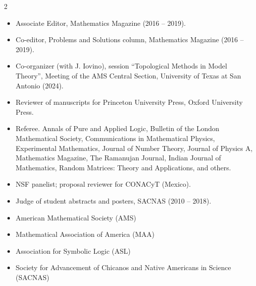 \documentclass[10pt,a4paper,withhyper]{altacv}
\begin{document}
\begin{paracol}{2}
\begin{itemize}
  \item Associate Editor, Mathematics Magazine (2016 -- 2019).
  \item Co-editor, Problems and Solutions column, Mathematics Magazine (2016 -- 2019).
  \item Co-organizer (with J. Iovino), session ``Topological Methods in Model Theory'', Meeting of the AMS Central Section, University of Texas at San Antonio (2024).
  \item Reviewer of manuscripts for Princeton University Press, Oxford University Press.
  \item Referee. Annals of Pure and Applied Logic, Bulletin of the London Mathematical Society, Communications in Mathematical Physics, Experimental Mathematics, Journal of Number Theory, Journal of Physics A, Mathematics Magazine, The Ramanujan Journal, Indian Journal of Mathematics, Random Matrices: Theory and Applications, and others.
  \item NSF panelist; proposal reviewer for CONACyT (Mexico).
  \item Judge of student abstracts and posters, SACNAS (2010 -- 2018).
\end{itemize}

\begin{itemize}
  \item American Mathematical Society (AMS)
  \item Mathematical Association of America (MAA)
  \item Association for Symbolic Logic (ASL)
  \item Society for Advancement of Chicanos and Native Americans in Science (SACNAS)
\end{itemize}

\end{paracol}
\end{document}
